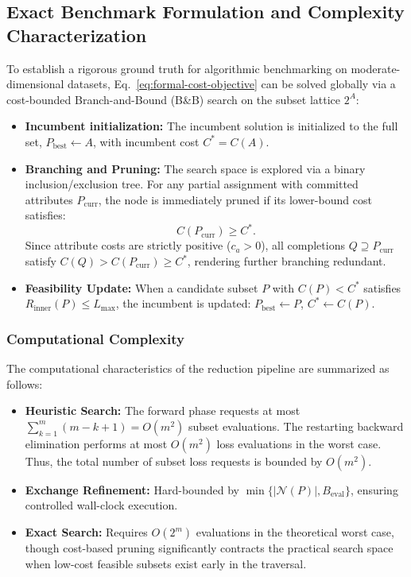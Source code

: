 \subsection{Exact Benchmark Formulation and Complexity Characterization}
\label{subsec:exact-search}
To establish a rigorous ground truth for algorithmic benchmarking on moderate-dimensional datasets, Eq.~\eqref{eq:formal-cost-objective} can be solved globally via a cost-bounded Branch-and-Bound (B\&B) search on the subset lattice $2^A$:
\begin{itemize}
	\item \textbf{Incumbent initialization:} The incumbent solution is initialized to the full set, $P_{\mathrm{best}} \gets A$, with incumbent cost $C^* = C(A)$.
	\item \textbf{Branching and Pruning:} The search space is explored via a binary inclusion/exclusion tree. For any partial assignment with committed attributes $P_{\mathrm{curr}}$, the node is immediately pruned if its lower-bound cost satisfies:
	\begin{equation}
		C(P_{\mathrm{curr}}) \ge C^*.
		\label{eq:cost-prune}
	\end{equation}
	Since attribute costs are strictly positive ($c_a > 0$), all completions $Q \supseteq P_{\mathrm{curr}}$ satisfy $C(Q) > C(P_{\mathrm{curr}}) \ge C^*$, rendering further branching redundant.
	\item \textbf{Feasibility Update:} When a candidate subset $P$ with $C(P) < C^*$ satisfies $R_{\mathrm{inner}}(P) \le L_{\max}$, the incumbent is updated: $P_{\mathrm{best}} \gets P$, $C^* \gets C(P)$.
\end{itemize}

\subsubsection{Computational Complexity}
The computational characteristics of the reduction pipeline are summarized as follows:
\begin{itemize}
	\item \textbf{Heuristic Search:} The forward phase requests at most $\sum_{k=1}^m (m - k + 1) = O(m^2)$ subset evaluations. The restarting backward elimination performs at most $O(m^2)$ loss evaluations in the worst case. Thus, the total number of subset loss requests is bounded by $O(m^2)$.
	\item \textbf{Exchange Refinement:} Hard-bounded by $\min\{|\mathcal{N}(P)|, B_{\mathrm{eval}}\}$, ensuring controlled wall-clock execution.
	\item \textbf{Exact Search:} Requires $O(2^m)$ evaluations in the theoretical worst case, though cost-based pruning significantly contracts the practical search space when low-cost feasible subsets exist early in the traversal.
\end{itemize}

